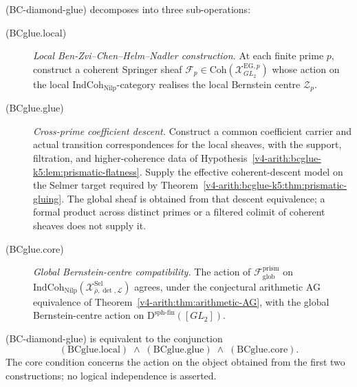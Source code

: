 \begin{definition}
\label{v4-arith:bcglue-k5:def:three-sub-operations}
(BC-diamond-glue) decomposes into three sub-operations:
\begin{description}
\item[(BCglue.local)] \emph{Local Ben-Zvi--Chen--Helm--Nadler construction.} At each
finite prime \(p\), construct a coherent Springer sheaf
\(\mathcal{F}_{p}\in\mathrm{Coh}(\mathcal{X}^{\mathrm{EG},p}_{GL_{2}})\)
whose action on the local \(\mathrm{IndCoh}_{\mathrm{Nilp}}\)-category
realises the local Bernstein centre \(\mathcal{Z}_{p}\).
\item[(BCglue.glue)] \emph{Cross-prime coefficient descent.}
Construct a common coefficient carrier and actual transition
correspondences for the local sheaves, with the support, filtration,
and higher-coherence data of
Hypothesis~\ref{v4-arith:bcglue-k5:lem:prismatic-flatness}.
Supply the effective coherent-descent model on the Selmer target
required by Theorem~\ref{v4-arith:bcglue-k5:thm:prismatic-gluing}.
The global sheaf is obtained from that descent equivalence; a
formal product across distinct primes or a filtered colimit of
coherent sheaves does not supply it.
\item[(BCglue.core)] \emph{Global Bernstein-centre compatibility.}
The action of \(\mathcal{F}_{\mathrm{glob}}^{\mathrm{prism}}\) on
\(\mathrm{IndCoh}_{\mathrm{Nilp}}(\mathcal{X}^{\mathrm{Sel}}_{\bar\rho,\det,\mathcal{L}})\)
agrees, under the conjectural arithmetic AG equivalence of
Theorem~\ref{v4-arith:thm:arithmetic-AG}, with the global Bernstein-centre
action on \(\mathrm{D}^{\mathrm{sph\text{-}fin}}([GL_{2}])\).
\end{description}
\end{definition}

\begin{theorem}
\label{v4-arith:bcglue-k5:thm:decomposition}
(BC-diamond-glue) is equivalent to the
conjunction
\[
(\mathrm{BCglue.local})\;\wedge\;(\mathrm{BCglue.glue})\;\wedge\;(\mathrm{BCglue.core}).
\]
The core condition concerns the action on the object obtained from
the first two constructions; no logical independence is asserted.
\end{theorem}

